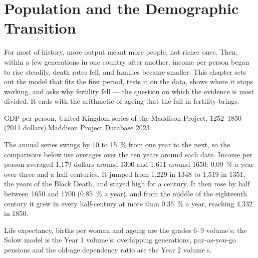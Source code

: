 \chapter{Population and the Demographic Transition}\label{ch:b3:demographic-transition}

For most of history, more output meant more people, not richer ones. Then, within a
few generations in one country after another, income per person began to rise
steadily, death rates fell, and families became smaller. This chapter sets out the
model that fits the first period, tests it on the data, shows where it stops
working, and asks why fertility fell --- the question on which the evidence is most
divided. It ends with the arithmetic of ageing that the fall in fertility brings.

\begin{openingchart}{GDP per person, United Kingdom series of the Maddison Project,
1252--1850 (2011 dollars).}{Maddison Project Database 2023}
\end{openingchart}

The annual series swings by 10 to 15~\% from one year to the next, so the comparisons
below use averages over the ten years around each date. Income per person averaged
1{,}179 dollars around 1300 and 1{,}611 around 1650: 0.09~\% a year over three and a half
centuries. It jumped from 1{,}229 in 1348 to 1{,}519 in 1351, the years of the Black Death, and stayed high for a
century. It then rose by half between 1650 and 1700 (0.85~\% a year), and from the middle of the eighteenth century it grew
in every half-century at more than 0.35~\% a year, reaching 4{,}332 in 1850.

\begin{recall}
Life expectancy, births per woman and ageing are the grades 6--9 volume's; the
Solow model is the Year 1 volume's; overlapping generations, pay-as-you-go pensions
and the old-age dependency ratio are the Year 2 volume's.
\end{recall}

